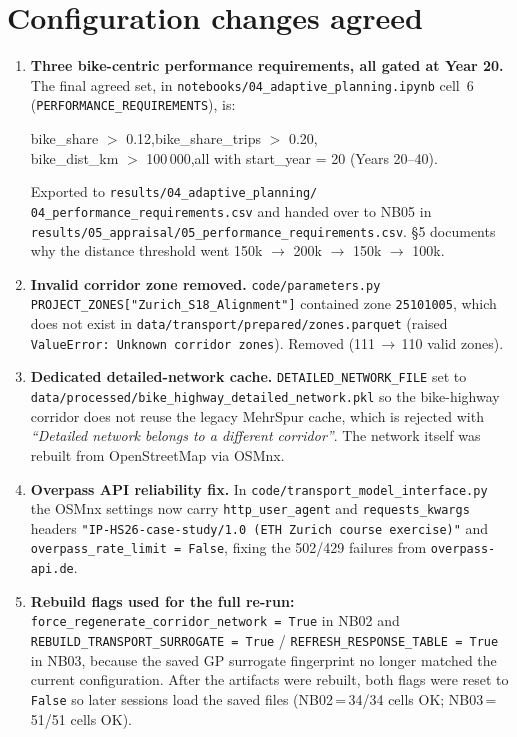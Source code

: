 \documentclass[11pt,a4paper]{article}
\begin{document}
\section{Configuration changes agreed}
\begin{enumerate}
  \item \textbf{Three bike-centric performance requirements, all gated at Year 20.}
        The final agreed set, in \texttt{notebooks/04\_adaptive\_planning.ipynb} cell~6
        (\texttt{PERFORMANCE\_REQUIREMENTS}), is:
        \begin{center}
        \small\ttfamily
        bike\_share ${>}$ 0.12,\quad bike\_share\_trips ${>}$ 0.20,\\
        bike\_dist\_km ${>}$ 100\,000,\quad all with start\_year = 20 (Years 20--40).
        \end{center}
        Exported to \texttt{results/04\_adaptive\_planning/}\allowbreak
        \texttt{04\_performance\_requirements.csv} and handed over to NB05 in
        \texttt{results/05\_appraisal/05\_performance\_requirements.csv}.
        \S5 documents why the distance threshold went 150k $\to$ 200k $\to$ 150k
        $\to$ 100k.
  \item \textbf{Invalid corridor zone removed.} \texttt{code/parameters.py}
        \texttt{PROJECT\_ZONES["Zurich\_S18\_Alignment"]} contained zone
        \texttt{25101005}, which does not exist in
        \texttt{data/transport/prepared/zones.parquet} (raised
        \texttt{ValueError: Unknown corridor zones}). Removed (111\,$\to$\,110 valid zones).
  \item \textbf{Dedicated detailed-network cache.}
        \texttt{DETAILED\_NETWORK\_FILE} set to
        \texttt{data/processed/}\allowbreak\texttt{bike\_highway\_detailed\_network.pkl}
        so the bike-highway corridor does not reuse the legacy MehrSpur cache, which is
        rejected with \textit{``Detailed network belongs to a different corridor''}.
        The network itself was rebuilt from OpenStreetMap via OSMnx.
  \item \textbf{Overpass API reliability fix.} In \texttt{code/transport\_model\_interface.py}
        the OSMnx settings now carry \texttt{http\_user\_agent} and
        \texttt{requests\_kwargs} headers
        \texttt{"IP-HS26-case-study/1.0 (ETH Zurich course exercise)"} and
        \texttt{overpass\_rate\_limit = False}, fixing the 502/429 failures from
        \texttt{overpass-api.de}.
  \item \textbf{Rebuild flags used for the full re-run:}
        \texttt{force\_regenerate\_corridor\_network = True} in NB02 and
        \texttt{REBUILD\_TRANSPORT\_SURROGATE = True} /
        \texttt{REFRESH\_RESPONSE\_TABLE = True} in NB03, because the saved GP
        surrogate fingerprint no longer matched the current configuration.
        After the artifacts were rebuilt, both flags were reset to \texttt{False}
        so later sessions load the saved files (NB02\,=\,34/34 cells OK;
        NB03\,=\,51/51 cells OK).
\end{enumerate}
\end{document}
